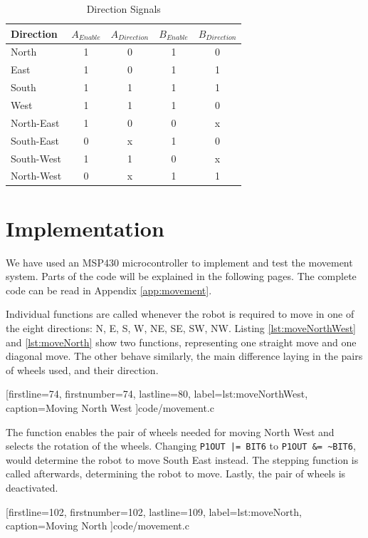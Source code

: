 \begin{table}[htp]
	\centering
	\vspace{-5mm}
	\caption{Direction Signals}
	\begin{tabular}{|l|c|c|c|c|}
		\hline
		Direction & $A_{Enable}$ & $A_{Direction}
		$ & $B_{Enable}$ & 
		$B_{Direction}$ \\
		\hline
		North 		& 1 & 0 & 1 & 0 \\
		East 		& 1 & 0 & 1 & 1 \\
		South 		& 1 & 1 & 1 & 1 \\
		West 		& 1 & 1 & 1 & 0 \\
		\hline	
		North-East 	& 1 & 0 & 0 & x \\
		South-East 	& 0 & x & 1 & 0 \\
		South-West 	& 1 & 1 & 0 & x \\
		North-West 	& 0 & x & 1 & 1 \\
		\hline
	\end{tabular}
	\label{tab:directions_signal}
\end{table}
\vfill
\clearpage
\section{Implementation}
\label{sec:movement_implementation}
We have used an MSP430 microcontroller to implement 
and test the
movement system. Parts of the code will be explained 
in the 
following pages. The complete code can be read in 
Appendix \ref{app:movement}.

Individual functions are called whenever the robot 
is required to 
move in one of the eight directions: N, E, S, W, NE, 
SE, SW, NW.  
Listing \ref{lst:moveNorthWest} and \ref{lst:moveNorth} show 
two functions, representing 
one straight 
move and one diagonal move. The other behave 
similarly, the main 
difference laying in the pairs of wheels used, and 
their direction.


[firstline=74,
firstnumber=74,
lastline=80,		
label=lst:moveNorthWest,
caption={Moving North West}
]{code/movement.c}

The function enables the pair of wheels needed for moving 
North West and selects the rotation of the 
wheels. Changing {\tt P1OUT |= BIT6} to {\tt P1OUT \&=  
\textasciitilde BIT6}, would determine the robot to move 
South East instead. The stepping function is called 
afterwards, determining the robot to move. Lastly, the pair 
of wheels is deactivated. 


[firstline=102,
firstnumber=102,
lastline=109,		
label=lst:moveNorth,
caption={Moving North}
]{code/movement.c}

